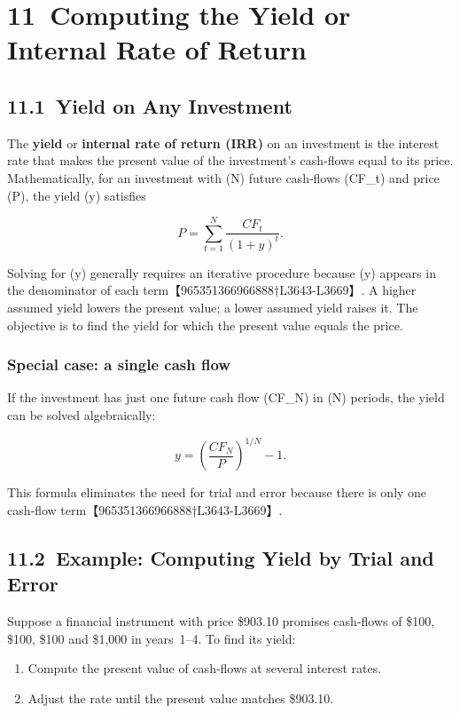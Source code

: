 \documentclass[
  letterpaper,
  DIV=11,
  numbers=noendperiod]{scrartcl}
\providecommand{\tightlist}{%
  \setlength{\itemsep}{0pt}\setlength{\parskip}{0pt}}
\begin{document}
\section{11~Computing the Yield or Internal Rate of
Return}\label{computing-the-yield-or-internal-rate-of-return}

\subsection{11.1~Yield on Any Investment}\label{yield-on-any-investment}

The \textbf{yield} or \textbf{internal rate of return (IRR)} on an
investment is the interest rate that makes the present value of the
investment's cash‑flows equal to its price. Mathematically, for an
investment with (N) future cash‑flows (CF\_t) and price (P), the yield
(y) satisfies

\[
P = \sum_{t=1}^{N} \frac{CF_t}{(1+y)^t}.
\]

Solving for (y) generally requires an iterative procedure because (y)
appears in the denominator of each term【965351366966888†L3643-L3669】.
A higher assumed yield lowers the present value; a lower assumed yield
raises it. The objective is to find the yield for which the present
value equals the price.

\subsubsection{Special case: a single cash
flow}\label{special-case-a-single-cash-flow}

If the investment has just one future cash flow (CF\_N) in (N) periods,
the yield can be solved algebraically:

\[
y = \left(\frac{CF_N}{P}\right)^{1/N} - 1.
\]

This formula eliminates the need for trial and error because there is
only one cash‑flow term【965351366966888†L3643-L3669】.

\subsection{11.2~Example: Computing Yield by Trial and
Error}\label{example-computing-yield-by-trial-and-error}

Suppose a financial instrument with price \$903.10 promises cash‑flows
of \$100, \$100, \$100 and \$1,000 in years~1--4. To find its yield:

\begin{enumerate}
\def\labelenumi{\arabic{enumi}.}
\tightlist
\item
  Compute the present value of cash‑flows at several interest rates.
\item
  Adjust the rate until the present value matches \$903.10.
\end{enumerate}
\end{document}
